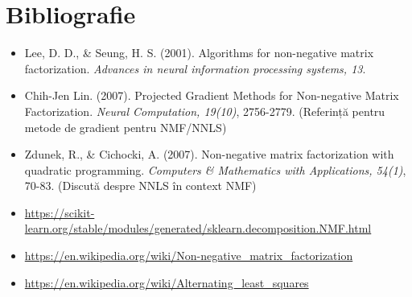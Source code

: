 \documentclass[12pt,a4paper]{article}
\begin{document}
\section{Bibliografie}
\begin{itemize}
\item Lee, D. D., \& Seung, H. S. (2001). Algorithms for non-negative matrix factorization. \textit{Advances in neural information processing systems, 13}.
\item Chih-Jen Lin. (2007). Projected Gradient Methods for Non-negative Matrix Factorization. \textit{Neural Computation, 19(10)}, 2756-2779. (Referință pentru metode de gradient pentru NMF/NNLS)
\item Zdunek, R., \& Cichocki, A. (2007). Non-negative matrix factorization with quadratic programming. \textit{Computers \& Mathematics with Applications, 54(1)}, 70-83. (Discută despre NNLS în context NMF)
\item \url{https://scikit-learn.org/stable/modules/generated/sklearn.decomposition.NMF.html}
\item \url{https://en.wikipedia.org/wiki/Non-negative_matrix_factorization}
\item \url{https://en.wikipedia.org/wiki/Alternating_least_squares}
\end{itemize}
\end{document}
